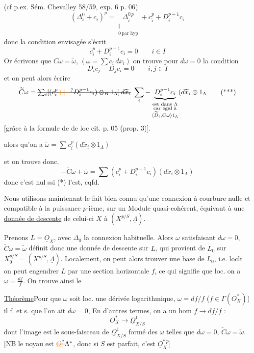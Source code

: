 (cf p.ex. Sém. Chevalley 58/59, exp. 6 p. 06)
\[
 (\Delta_i^0+c_i)^p=\underset{\substack{\Vert\\0\ \text{par hyp}}}{\Delta_i^{0\,p}}+c_i^p+D_i^{p-1}c_i
\]
donc la condition envisagée s'écrit
\[
 c_i^p+D_i^{p-1}c_i=0\qquad i\in I
 \tag*{(*)}
\]
Or écrivons que  $C\omega=\widetilde\omega$,  $(\omega=\sum c_i\,dx_i)$ on trouve pour $d\omega=0$ la condition
\[
 D_i c_j-D_j c_i=0\qquad i,j\in I
 \tag*{(**)}
\]
et on peut alors écrire
\[
 \widetilde C\omega=
 \deleted{\sum_i[(c_i^p\unsure{+|-}D_i^{p-1}c_i)\otimes_B1_\Lambda]\,d\widetilde x_i}\ 
 \sum_i-\underbrace{D_i^{p-1}c_i}_{\substack{\text{est dans }\Lambda\\
 \text{car égal à}\\\langle\widetilde D_i,C\omega\rangle1_\Lambda}}
 (d\widetilde x_i\otimes1_\Lambda
 \tag*{(***)}
\]
[grâce à la formule de \unsure{transposition|transformation} de loc cit. p. 05 (prop. 3)].

alors qu'on a $\widetilde\omega=\sum c_i^p(d\widetilde x_i\otimes1_\Lambda)$

et on trouve donc,
\[
 -\widetilde C\omega+\overline\omega=\sum(c_i^p+D_i^{p-1}c_i)(d\widetilde x_i\otimes1_\Lambda)
 \tag*{$*$}
\]
donc c'est nul ssi (*) l'est, cqfd.

Nous utilisons maintenant le fait bien connu qu'une connexion à courbure nulle  et compatible à la puissance $p$-ième, sur un Module quasi-cohérent, équivaut à une \uline{donnée de descente} de celui-ci  $X$ à $(X^{p/S},\underline\Lambda)$. 

 Prenons $L=\underline O_X$, avec $\Delta_0$ la connexion habituelle. Alors $\omega$ satisfaisant $d\omega=0$, $\widetilde C\omega=\widetilde\omega$ définit donc une donnée de descente sur $L$, qui  provient de $L_0$ sur $X_0^{p/S}=(X^{p/S},\underline\Lambda)$. Localement, on peut alors  trouver une base de $L_0$, i.e. loclt on peut engendrer $L$ par une section horizontale $f$, ce qui signifie que loc. on a $\omega=\frac{df}{f}$. On trouve ainsi le

\uline{Théorème}\quad Pour que  $\omega$ soit loc. une dérivée logarithmique, $\omega=df/f$ ($f\in\Gamma(O_X^*)$) il f. et s. que l'on ait $d\omega=0$,  En d'autres termes, on a un hom $f\longrightarrow df/f$ :
\[
 O_X^*\longrightarrow\underline\Omega^1_{X/S}
\]
dont l'image est le sous-faisceau de $\underline\Omega^1_{X/S}$ formé des $\omega$ telles que $d\omega=0$, $\widetilde C\omega=\widetilde\omega$. [NB le noyau est $\deleted{\unsure{\underline O}}\Lambda^*$, donc si $S$ est parfait, c'est $\underline O_X^{*\,p}$]

